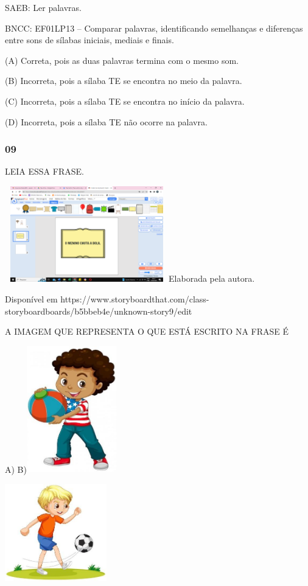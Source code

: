 SAEB: Ler palavras.

BNCC: EF01LP13 -- Comparar palavras, identificando semelhanças e
diferenças entre sons de sílabas iniciais, mediais e finais.

(A) Correta, pois as duas palavras termina com o mesmo som.

(B) Incorreta, pois a sílaba TE se encontra no meio da palavra.

(C) Incorreta, pois a sílaba TE se encontra no início da palavra.

(D) Incorreta, pois a sílaba TE não ocorre na palavra.

\subsubsection{09}\label{section-34}

LEIA ESSA FRASE.

\includegraphics[width=2.80293in,height=1.64007in]{media/image198.png}Elaborada
pela autora.

Disponível em
https://www.storyboardthat.com/class-storyboardboards/b5bbeb4e/unknown-story9/edit

A IMAGEM QUE REPRESENTA O QUE ESTÁ ESCRITO NA FRASE É

A)
B)\includegraphics[width=1.53194in,height=2.16250in]{media/image199.jpg}

\includegraphics[width=1.73760in,height=1.66822in]{media/image200.jpg}

